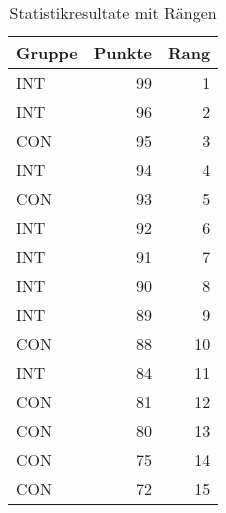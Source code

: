 \documentclass[
]{book}
\begin{document}
\begin{table}

\caption{\label{tab:data-statex}Statistikresultate mit Rängen}
\centering
\begin{tabular}[t]{l|r|r}
\hline
Gruppe & Punkte & Rang\\
\hline
INT & 99 & 1\\
\hline
INT & 96 & 2\\
\hline
CON & 95 & 3\\
\hline
INT & 94 & 4\\
\hline
CON & 93 & 5\\
\hline
INT & 92 & 6\\
\hline
INT & 91 & 7\\
\hline
INT & 90 & 8\\
\hline
INT & 89 & 9\\
\hline
CON & 88 & 10\\
\hline
INT & 84 & 11\\
\hline
CON & 81 & 12\\
\hline
CON & 80 & 13\\
\hline
CON & 75 & 14\\
\hline
CON & 72 & 15\\
\hline
\end{tabular}
\end{table}
\end{document}
